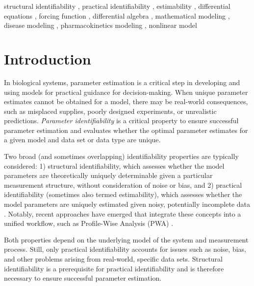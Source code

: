 \documentclass[a4paper,fleqn]{cas-dc}
\theoremstyle{definition}
\begin{document}
\begin{keywords}
structural identifiability \sep 
practical identifiability \sep 
estimability \sep 
differential equations \sep 
forcing function \sep 
differential algebra \sep 
mathematical modeling \sep 
disease modeling \sep 
pharmacokinetics modeling \sep 
nonlinear model
\end{keywords}

\maketitle

\section{Introduction}

\noindent In biological systems, parameter estimation is a critical step in developing and using models for practical guidance for decision-making. When unique parameter estimates cannot be obtained for a model, there may be real-world consequences, such as misplaced supplies, poorly designed experiments, or unrealistic predictions.
\textit{Parameter identifiability} is a critical property to ensure successful parameter estimation and evaluates whether the optimal parameter estimates for a given model and data set or data type are unique.

Two broad (and sometimes overlapping) identifiability properties are typically considered: 1) structural identifiability, which assesses whether the model parameters are theoretically uniquely determinable given a particular measurement structure, without consideration of noise or bias, and 2) practical identifiability (sometimes also termed estimability), which assesses whether the model parameters are uniquely estimated given noisy, potentially incomplete data \cite{saccomani2003parameter, eisenbergDeterminingIdentifiableParameter2014, meshkat2015identifiability}.
Notably, recent approaches have emerged that integrate these concepts into a unified workflow, such as Profile-Wise Analysis (PWA) \cite{simpson2023profile}.

Both properties depend on the underlying model of the system and measurement process. Still, only practical identifiability accounts for issues such as noise, bias, and other problems arising from real-world, specific data sets.
Structural identifiability is a prerequisite for practical identifiability and is therefore necessary to ensure successful parameter estimation.
\end{document}
